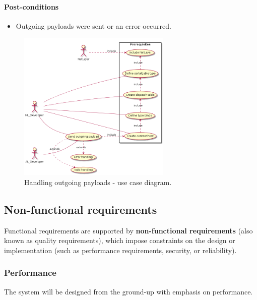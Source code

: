 \documentclass[12pt]{report}
\renewcommand\emph{\textbf}
\begin{document}
                    \paragraph{Post-conditions}
                        \begin{itemize}
                            \item Outgoing payloads were sent or an error occurred.
                        \end{itemize}

                    \begin{figure}[H]
                    \caption{Handling outgoing payloads - use case diagram.}
                    \centering
                    \includegraphics[width=0.65\textwidth]{d/uc/outgoing.png}
                    \end{figure}



            \newpage

            \subsection{Non-functional requirements}
                Functional requirements are supported by \emph{non-functional requirements} (also known as quality requirements), which impose constraints on the design or implementation (such as performance requirements, security, or reliability).

                \subsubsection{Performance}
                    The system will be designed from the ground-up with emphasis on performance. 
\end{document}
